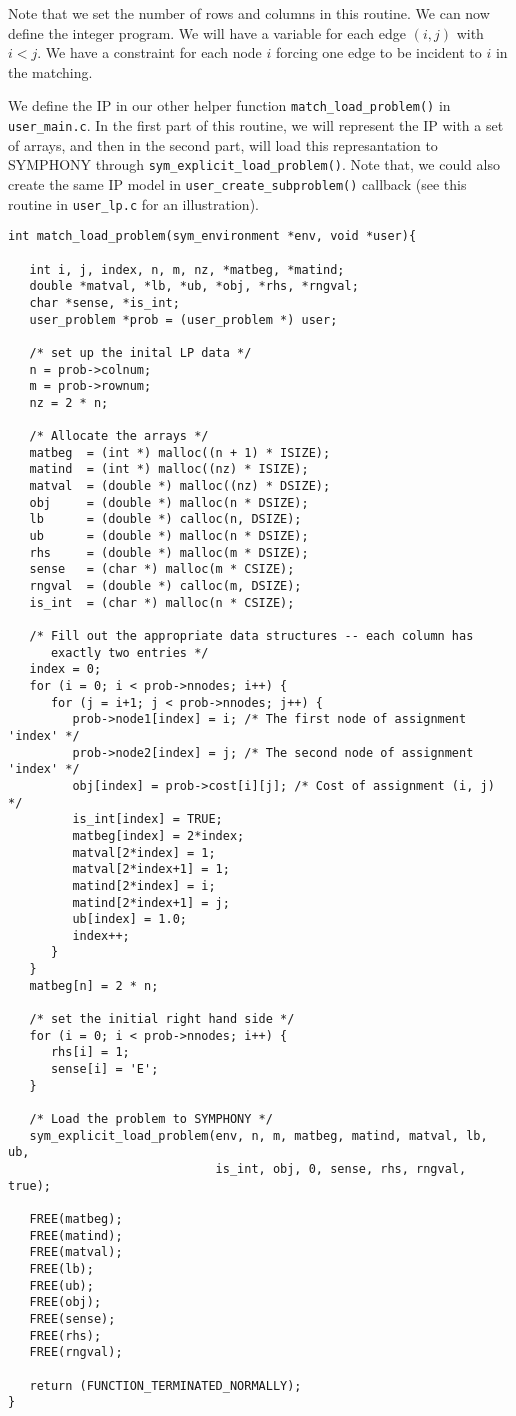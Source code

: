 \documentclass[11pt]{article}
\begin{document}
Note that we set the number of rows and columns in this routine. We can now
define the integer program. We will have a variable for each edge $(i,j)$ with
$i<j$. We have a constraint for each node $i$ forcing one edge to be incident
to $i$ in the matching.

We define the IP in our other helper function 
\texttt{match\_load\_problem()} in \texttt{user\_main.c}. In the 
first part of this routine, we will represent the IP with a set of arrays, 
and then in the second part, will load this represantation to SYMPHONY through 
\texttt{sym\_explicit\_load\_problem()}. Note that, we could also create the 
same IP model in \texttt{user\_create\_subproblem()} callback (see 
this routine in \texttt{user\_lp.c} for an illustration).

\begin{verbatim}
int match_load_problem(sym_environment *env, void *user){
   
   int i, j, index, n, m, nz, *matbeg, *matind;
   double *matval, *lb, *ub, *obj, *rhs, *rngval;
   char *sense, *is_int;
   user_problem *prob = (user_problem *) user;

   /* set up the inital LP data */
   n = prob->colnum;
   m = prob->rownum;
   nz = 2 * n;

   /* Allocate the arrays */
   matbeg  = (int *) malloc((n + 1) * ISIZE);
   matind  = (int *) malloc((nz) * ISIZE);
   matval  = (double *) malloc((nz) * DSIZE);
   obj     = (double *) malloc(n * DSIZE);
   lb      = (double *) calloc(n, DSIZE);
   ub      = (double *) malloc(n * DSIZE);
   rhs     = (double *) malloc(m * DSIZE);
   sense   = (char *) malloc(m * CSIZE);
   rngval  = (double *) calloc(m, DSIZE);
   is_int  = (char *) malloc(n * CSIZE);
   
   /* Fill out the appropriate data structures -- each column has
      exactly two entries */
   index = 0;
   for (i = 0; i < prob->nnodes; i++) {
      for (j = i+1; j < prob->nnodes; j++) {
         prob->node1[index] = i; /* The first node of assignment 'index' */
         prob->node2[index] = j; /* The second node of assignment 'index' */
         obj[index] = prob->cost[i][j]; /* Cost of assignment (i, j) */
         is_int[index] = TRUE;
         matbeg[index] = 2*index;
         matval[2*index] = 1;
         matval[2*index+1] = 1;
         matind[2*index] = i;
         matind[2*index+1] = j;
         ub[index] = 1.0;
         index++;
      }
   }
   matbeg[n] = 2 * n;
   
   /* set the initial right hand side */
   for (i = 0; i < prob->nnodes; i++) {
      rhs[i] = 1;
      sense[i] = 'E';
   }

   /* Load the problem to SYMPHONY */   
   sym_explicit_load_problem(env, n, m, matbeg, matind, matval, lb, ub, 
                             is_int, obj, 0, sense, rhs, rngval, true);
			     
   FREE(matbeg);
   FREE(matind);
   FREE(matval);
   FREE(lb);
   FREE(ub);
   FREE(obj);
   FREE(sense);
   FREE(rhs);
   FREE(rngval);

   return (FUNCTION_TERMINATED_NORMALLY);
}
\end{verbatim}
\end{document}
